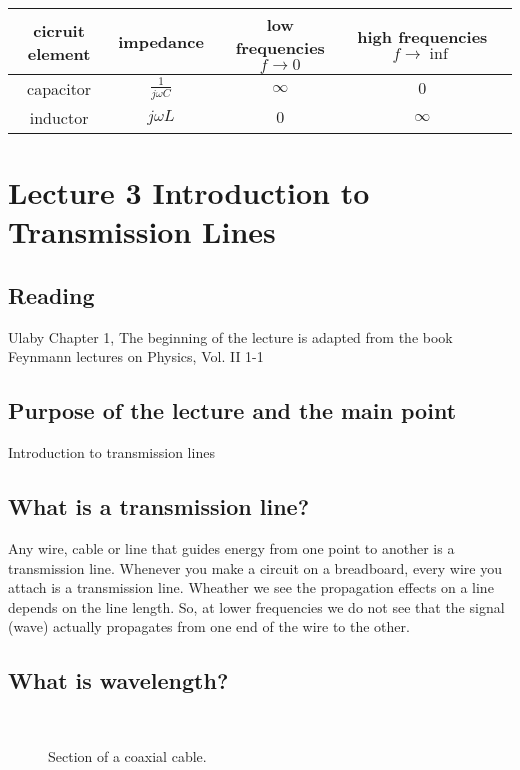 \begin{center}
\begin{tabular}{|c|c|c|c|c|} \hline
cicruit element & impedance & low frequencies $f \to 0$& high frequencies $f \to \inf$   \\  \hline  
 capacitor     & $\frac{1}{j \omega C}$    & $\infty$ & $0$    \\  \hline       
 inductor & $j \omega L$              &    $0$   &       $\infty $             \\ \hline
\end{tabular}
\end{center}


\section{Lecture  3  Introduction to Transmission Lines}



\subsection{Reading}
Ulaby Chapter 1, The beginning of the lecture is adapted from the book Feynmann lectures on Physics, Vol. II 1-1

\subsection{Purpose of the lecture and the main point}

Introduction to transmission lines


\subsection{What is a transmission line?}

Any wire, cable or line that guides energy from one point to another
is a transmission line. Whenever you make a circuit on a breadboard,
every wire you attach is  a transmission line. Wheather we see the propagation effects on a
line depends on the line length. So, at lower frequencies we do not
see that the signal (wave) actually propagates from one end of the wire to
the other. 


\subsection{What is wavelength?}




\begin{figure}[htbp]
\begin{center}
\strut{} \\
\end{center}
\caption{Section of a coaxial cable.}
\label{wind}
\end{figure}





